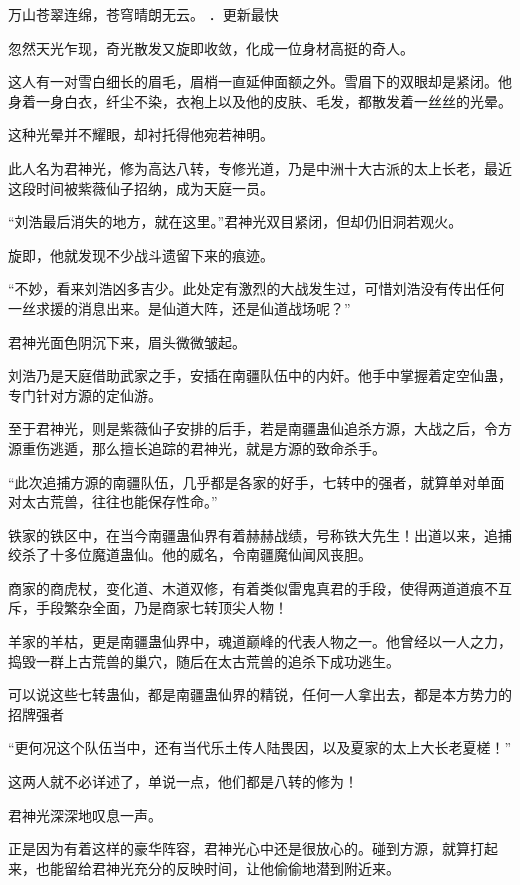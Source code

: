
\begin{this_body}

万山苍翠连绵，苍穹晴朗无云。 ．更新最快

忽然天光乍现，奇光散发又旋即收敛，化成一位身材高挺的奇人。

这人有一对雪白细长的眉毛，眉梢一直延伸面额之外。雪眉下的双眼却是紧闭。他身着一身白衣，纤尘不染，衣袍上以及他的皮肤、毛发，都散发着一丝丝的光晕。

这种光晕并不耀眼，却衬托得他宛若神明。

此人名为君神光，修为高达八转，专修光道，乃是中洲十大古派的太上长老，最近这段时间被紫薇仙子招纳，成为天庭一员。

“刘浩最后消失的地方，就在这里。”君神光双目紧闭，但却仍旧洞若观火。

旋即，他就发现不少战斗遗留下来的痕迹。

“不妙，看来刘浩凶多吉少。此处定有激烈的大战发生过，可惜刘浩没有传出任何一丝求援的消息出来。是仙道大阵，还是仙道战场呢？”

君神光面色阴沉下来，眉头微微皱起。

刘浩乃是天庭借助武家之手，安插在南疆队伍中的内奸。他手中掌握着定空仙蛊，专门针对方源的定仙游。

至于君神光，则是紫薇仙子安排的后手，若是南疆蛊仙追杀方源，大战之后，令方源重伤逃遁，那么擅长追踪的君神光，就是方源的致命杀手。

“此次追捕方源的南疆队伍，几乎都是各家的好手，七转中的强者，就算单对单面对太古荒兽，往往也能保存性命。”

铁家的铁区中，在当今南疆蛊仙界有着赫赫战绩，号称铁大先生！出道以来，追捕绞杀了十多位魔道蛊仙。他的威名，令南疆魔仙闻风丧胆。

商家的商虎杖，变化道、木道双修，有着类似雷鬼真君的手段，使得两道道痕不互斥，手段繁杂全面，乃是商家七转顶尖人物！

羊家的羊枯，更是南疆蛊仙界中，魂道巅峰的代表人物之一。他曾经以一人之力，捣毁一群上古荒兽的巢穴，随后在太古荒兽的追杀下成功逃生。

可以说这些七转蛊仙，都是南疆蛊仙界的精锐，任何一人拿出去，都是本方势力的招牌强者

“更何况这个队伍当中，还有当代乐土传人陆畏因，以及夏家的太上大长老夏槎！”

这两人就不必详述了，单说一点，他们都是八转的修为！

君神光深深地叹息一声。

正是因为有着这样的豪华阵容，君神光心中还是很放心的。碰到方源，就算打起来，也能留给君神光充分的反映时间，让他偷偷地潜到附近来。


\end{this_body}
